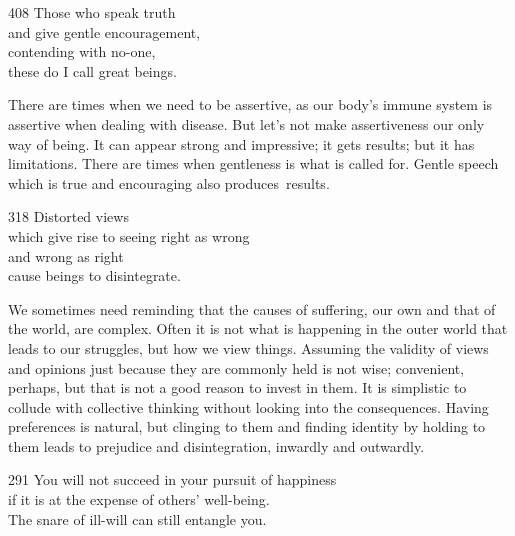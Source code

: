 
\begin{dhpVerse}{408}
\label{dhp-408}
Those who speak truth\\
and give gentle encouragement,\\
contending with no-one,\\
these do I call great beings.
\end{dhpVerse}

\begin{dhpRefl}
  There are times when we need to be assertive, as our body’s immune system is
  assertive when dealing with disease. But let’s not make \mbox{assertiveness} our only
  way of being. It can appear strong and impressive; it gets results; but it has
  limitations. There are times when gentleness is what is called for. Gentle
  speech which is true and encouraging also produces~results.
\end{dhpRefl}


\begin{dhpVerse}{318}
\label{dhp-318}
Distorted views\\
which give rise to seeing right as wrong\\
and wrong as right\\
cause beings to disintegrate.
\end{dhpVerse}

\begin{dhpRefl}
  We sometimes need reminding that the causes of suffering, our own and that of
  the world, are complex. Often it is not what is happening in the outer world
  that leads to our struggles, but how we view things. Assuming the validity of
  views and opinions just because they are commonly held is not wise;
  convenient, perhaps, but that is not a good reason to invest in them. It is
  simplistic to collude with collective thinking without looking into the
  consequences. Having preferences is natural, but clinging to them and finding
  identity by holding to them leads to prejudice and disintegration, inwardly
  and outwardly.
\end{dhpRefl}


\begin{dhpVerse}{291}
\label{dhp-291}
You will not succeed in your pursuit of happiness\\
if it is at the expense of others' well-being.\\
The snare of ill-will can still entangle you. 
\end{dhpVerse}

